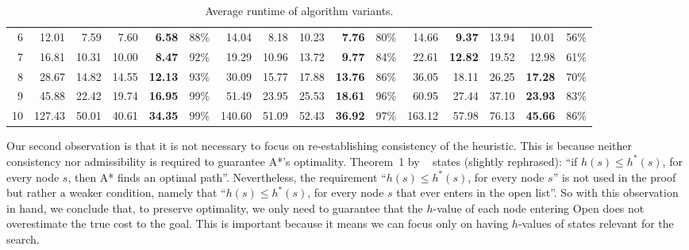 \documentclass{article}
\newcommand{\acite}[1]{\citeauthor{#1}~\shortcite{#1}}
\begin{document}
\begin{table*}
{\begin{tabular}{rrrrrrrrrrrrrrrr}
    6     &     12.01  &        7.59  &         7.60  & \textbf{            6.58} & 88\%  &     14.04  &     8.18  &       10.23  & \textbf{            7.76} & 80\%  &     14.66  & \textbf{    9.37} &       13.94  &           10.01  & 56\% \\

    7     &     16.81  &     10.31  &       10.00  & \textbf{            8.47} & 92\%  &     19.29  &   10.96  &       13.72  & \textbf{            9.77} & 84\%  &     22.61  & \textbf{  12.82} &       19.52  &           12.98  & 61\% \\

    8     &     28.67  &     14.82  &       14.55  & \textbf{          12.13} & 93\%  &     30.09  &   15.77  &       17.88  & \textbf{          13.76} & 86\%  &     36.05  & 18.11 &       26.25  &           \textbf{  17.28}  & 70\% \\

    9     &     45.88  &     22.42  &       19.74  & \textbf{          16.95} & 99\%  &     51.49  &   23.95  &       25.53  & \textbf{          18.61} & 96\%  &     60.95  &   27.44  &       37.10  & \textbf{          23.93} & 83\% \\ 

    10    &   127.43  &     50.01  &       40.61  & \textbf{          34.35} & 99\%  &   140.60  &   51.09  &       52.43  & \textbf{          36.92} & 97\%  &   163.12  &   57.98  &       76.13  & \textbf{          45.66} & 86\% \\

    \bottomrule

    \end{tabular}%
}
\caption{Average runtime of algorithm variants. %
}  \label{runtime}%

\end{table*}%


Our second observation is that it is not necessary to focus on re-establishing consistency of the heuristic. This is because neither consistency nor admissibility is required to guarantee A*'s optimality. Theorem~1 by \acite{HartNR68} states (slightly rephrased): ``if $h(s)\leq h^*(s)$, for every node $s$, then A* finds an optimal path''. Nevertheless, the requirement ``$h(s)\leq h^*(s)$, for every node $s$'' is not used in the proof but rather a weaker condition, namely that ``$h(s)\leq h^*(s)$, for every node $s$ that ever enters in the open list''. So with this observation in hand, we conclude that, to preserve optimality, we only need to guarantee that the $h$-value of each node entering Open does not overestimate the true cost to the goal. This is important because it means we can focus only on having $h$-values of  states relevant for the search.
\end{document}
